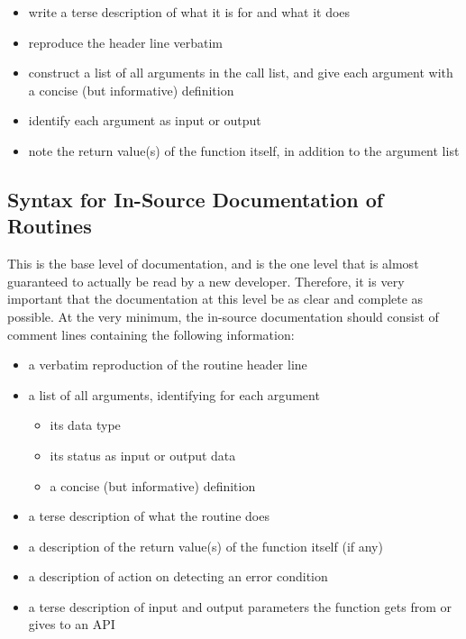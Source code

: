 \begin{itemize}
\begin{itemize}
\begin{itemize}
\item write a terse description of what it is for and what it does
\item reproduce the header line verbatim
\item construct a list of all arguments in the call list, and give
each argument with a concise (but informative) definition
\item identify each argument as input or output
\item note the return value(s) of the function itself, in addition to
the argument list
\end{itemize}

\end{itemize}

\end{itemize}

\subsection{Syntax for In-Source Documentation of Routines}

This is the base level of documentation, and is the one level that is almost
guaranteed to actually be read by a new developer.  Therefore, it is very
important that the documentation at this level be as clear and complete as
possible.  At the very minimum, the in-source documentation should consist of
comment lines
containing
the following information:

\begin{itemize}
\item a verbatim reproduction of the routine header line
\item a list of all arguments, identifying for each argument
\begin{itemize}
\item its data type
\item its status as input or output data
\item a concise (but informative) definition
\end{itemize}
\item a terse description of what the routine does
\item a description of the return value(s) of the function itself (if any)
\item a description of action on detecting an error condition
\item a terse description of input and output parameters the function
gets from or gives to an API
\end{itemize}

